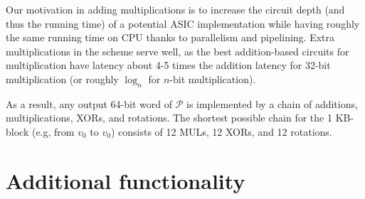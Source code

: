 \documentclass[a4paper]{article}
\begin{document}
Our motivation in adding multiplications is to increase the circuit depth (and thus the running time) of a potential ASIC implementation while having roughly the same running time on CPU thanks to parallelism and pipelining. Extra multiplications in the scheme serve well, as the best addition-based circuits for multiplication have latency about 4-5 times the addition latency for 32-bit multiplication (or roughly $\log_n$ for $n$-bit multiplication).

As a result, any output 64-bit word of  $\mathcal{P}$  is implemented by a chain of additions, multiplications, XORs, and rotations. The shortest possible chain for the 1 KB-block (e.g, from $v_0$  to $v_0$) consists of 12 MULs, 12 XORs, and 12 rotations.

\section{Additional functionality}
\end{document}
